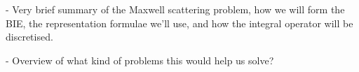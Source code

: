 - Very brief summary of the Maxwell scattering problem, how we will form the BIE, the representation formulae we'll use, and how the integral operator will be discretised.

- Overview of what kind of problems this would help us solve?

